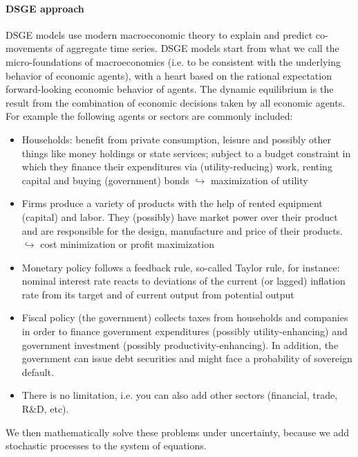 \paragraph*{DSGE approach}
DSGE models use modern macroeconomic theory to explain and predict co-movements of aggregate time series.
DSGE models start from what we call the micro-foundations of macroeconomics
  (i.e. to be consistent with the underlying behavior of economic agents),
  with a heart based on the rational expectation forward-looking economic behavior of agents.
The dynamic equilibrium is the result from the combination of economic decisions taken by all economic agents.
For example the following agents or sectors are commonly included:
\begin{itemize}
  \item Households: benefit from private consumption, leisure and possibly other things like money holdings or state services;
    subject to a budget constraint in which they finance their expenditures 
    via (utility-reducing) work, renting capital and buying (government) bonds
    $\hookrightarrow$ maximization of utility
  \item Firms produce a variety of products with the help of rented equipment (capital) and labor.
  They (possibly) have market power over their product and are responsible for
    the design, manufacture and price of their products.
    $\hookrightarrow$ cost minimization or profit maximization
  \item Monetary policy follows a feedback rule, so-called Taylor rule, for instance: 
    nominal interest rate reacts to deviations of the current (or lagged) inflation rate
    from its target and of current output from potential output
  \item Fiscal policy (the government) collects taxes from households and companies 
    in order to finance government expenditures (possibly utility-enhancing) 
    and government investment (possibly productivity-enhancing).
    In addition, the government can issue debt securities and might face a probability of sovereign default.
  \item There is no limitation, i.e. you can also add other sectors (financial, trade, R\&D, etc).
\end{itemize}
 We then mathematically solve these problems under uncertainty,
   because we add stochastic processes to the system of equations. 
